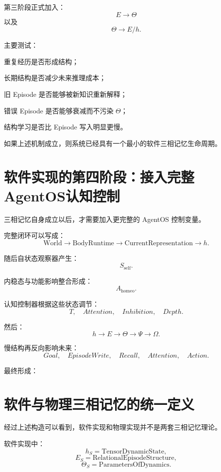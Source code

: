 第三阶段正式加入：
\[
E\rightarrow\Theta
\]
以及
\[
\Theta\rightarrow E/h.
\]

主要测试：

重复经历是否形成结构；

长期结构是否减少未来推理成本；

旧 Episode 是否能够被新知识重新解释；

错误 Episode 是否能够衰减而不污染 $\Theta$；

结构学习是否比 Episode 写入明显更慢。

如果上述机制成立，则系统已经具有一个最小的软件三相记忆生命周期。

\section{软件实现的第四阶段：接入完整AgentOS认知控制}

三相记忆自身成立以后，才需要加入更完整的 AgentOS 控制变量。

完整闭环可以写成：
\[
\mathrm{World}
\rightarrow
\mathrm{BodyRuntime}
\rightarrow
\mathrm{CurrentRepresentation}
\rightarrow
h.
\]

随后自状态观察器产生：
\[
S_{\mathrm{self}}.
\]

内稳态与功能影响整合形成：
\[
A_{\mathrm{homeo}}.
\]

认知控制器根据这些状态调节：
\[
T,
\quad
Attention,
\quad
Inhibition,
\quad
Depth.
\]

然后：
\[
h
\rightarrow
E
\rightarrow
\Theta
\rightarrow
\Psi
\rightarrow
\Omega.
\]

慢结构再反向影响未来：
\[
Goal,
\quad
EpisodeWrite,
\quad
Recall,
\quad
Attention,
\quad
Action.
\]

最终形成：
\begin{statementbox}
\centering
{}
\end{statementbox}

\section{软件与物理三相记忆的统一定义}

经过上述构造可以看到，软件实现和物理实现并不是两套三相记忆理论。

软件实现中：
\[
h_S
=
\mathrm{TensorDynamicState},
\]
\[
E_S
=
\mathrm{RelationalEpisodeStructure},
\]
\[
\Theta_S
=
\mathrm{ParametersOfDynamics}.
\]

